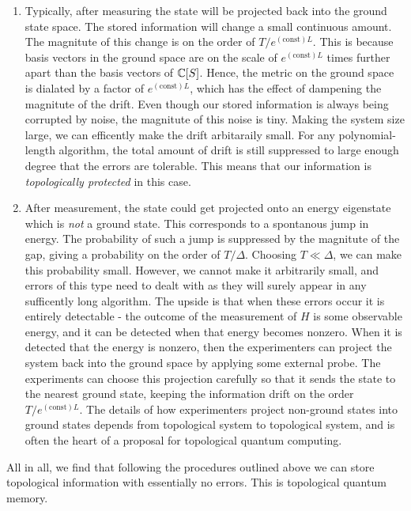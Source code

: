 \documentclass{article}
\theoremstyle{definition}
\numberwithin{figure}{section}
\begin{document}
\begin{enumerate}
\item Typically, after measuring the state will be projected back into the ground state space. The stored information will change a small continuous amount. The magnitute of this change is on the order of $T/e^{(\text{const})L}$. This is because basis vectors in the ground space are on the scale of $e^{(\text{const})L}$ times further apart than the basis vectors of $\mathbb{C}[S]$. Hence, the metric on the ground space is dialated by a factor of $e^{(\text{const})L}$, which has the effect of dampening the magnitute of the drift. Even though our stored information is always being corrupted by noise, the magnitute of this noise is tiny. Making the system size large, we can efficently make the drift arbitaraily small. For any polynomial-length algorithm, the total amount of drift is still suppressed to large enough degree that the errors are tolerable. This means that our information is \textit{topologically protected} in this case.

\item After measurement, the state could get projected onto an energy eigenstate which is \textit{not} a ground state. This corresponds to a spontanous jump in energy. The probability of such a jump is suppressed by the magnitute of the gap, giving a probability on the order of $T/\Delta$. Choosing $T\ll \Delta$, we can make this probability small. However, we cannot make it arbitrarily small, and errors of this type need to dealt with as they will surely appear in any sufficently long algorithm. The upside is that when these errors occur it is entirely detectable - the outcome of the measurement of $H$ is some observable energy, and it can be detected when that energy becomes nonzero. When it is detected that the energy is nonzero, then the experimenters can project the system back into the ground space by applying some external probe. The experiments can choose this projection carefully so that it sends the state to the nearest ground state, keeping the information drift on the order $T/e^{(\text{const})L}$. The details of how experimenters project non-ground states into ground states depends from topological system to topological system, and is often the heart of a proposal for topological quantum computing.
\end{enumerate}

All in all, we find that following the procedures outlined above we can store topological information with essentially no errors. This is topological quantum memory.
\end{document}
